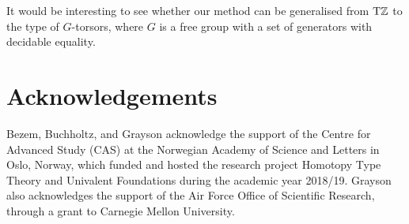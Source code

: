 \documentclass[a4paper,12pt]{amsart}
\begin{document}
It would be interesting to see whether our method can be generalised
from ${\mathrm{T}\mathbb{Z}}$ to the type of $G$-torsors, where $G$ is a free group with
a set of generators with decidable equality.

\section{Acknowledgements}
Bezem, Buchholtz, and Grayson acknowledge the support of the Centre for Advanced Study (CAS)
at the Norwegian Academy of Science and Letters
in Oslo, Norway, which funded and hosted the research project Homotopy Type Theory and Univalent Foundations during the academic year 2018/19.
Grayson also acknowledges the support of the Air Force Office of Scientific Research, through a grant to Carnegie Mellon University.




\end{document}
